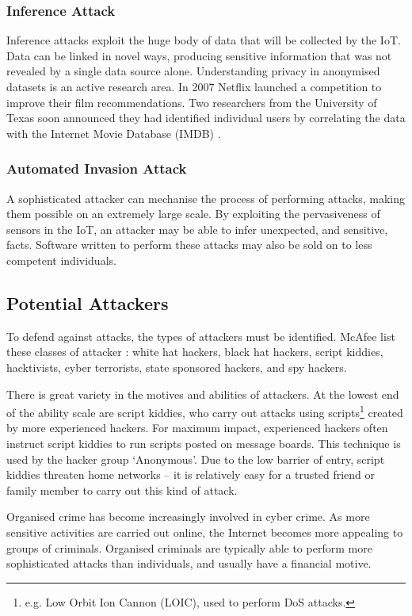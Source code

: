 \documentclass[10pt,journal,compsoc]{IEEEtran}
\begin{document}
\subsubsection{Inference Attack}
Inference attacks exploit the huge body of data that will be collected by the
IoT. Data can be linked in novel ways, producing sensitive information that was
not revealed by a single data source alone. Understanding privacy in anonymised
datasets is an active research area. In 2007 Netflix launched a competition to
improve their film recommendations. Two researchers from the University of
Texas soon announced they had identified individual users by correlating the
data with the Internet Movie Database (IMDB) \cite{Narayanan2008}.

\subsubsection{Automated Invasion Attack}
A sophisticated attacker can mechanise the process of performing attacks,
making them possible on an extremely large scale. By exploiting the
pervasiveness of sensors in the IoT, an attacker may be able to infer
unexpected, and sensitive, facts. Software written to perform these attacks
may also be sold on to less competent individuals. 

\subsection{Potential Attackers}
To defend against attacks, the types of attackers must be identified. McAfee
list these classes of attacker \cite{McAfee2011}: white hat hackers, black hat
hackers, script kiddies, hacktivists, cyber terrorists, state sponsored
hackers, and spy hackers. 

There is great variety in the motives and abilities of attackers. At
the lowest end of the ability scale are script kiddies, who carry out attacks
using scripts\footnote{e.g. Low Orbit Ion Cannon (LOIC), used to perform DoS
attacks.} created by more experienced hackers. For maximum impact, experienced
hackers often instruct script kiddies to run scripts posted on message boards.
This technique is used by the hacker group `Anonymous'. Due to the low barrier
of entry, script kiddies threaten home networks -- it is relatively easy for a
trusted friend or family member to carry out this kind of attack. 

Organised crime has become increasingly involved in cyber crime. As more
sensitive activities are carried out online, the Internet becomes more
appealing to groups of criminals. Organised criminals are typically able to
perform more sophisticated attacks than individuals, and usually have a
financial motive. 
\end{document}
